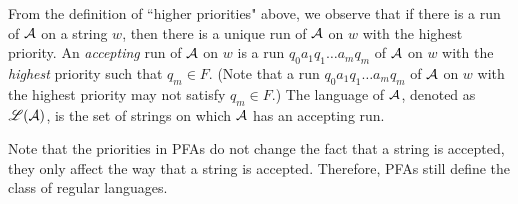 From the definition of ``higher priorities" above, we observe that if there is a  run of $\mathcal{A}$ on a string $w$, then there is a unique run of $\mathcal{A}$ on $w$ with the highest priority. 
An \emph{accepting} run of $\mathcal{A}$ on $w$ is a run $q_0 a_1 q_1 \ldots a_m q_m$ of $\mathcal{A}$ on $w$ with the \emph{highest} priority such that $q_m \in F$. (Note that a run $q_0 a_1 q_1 \ldots a_m q_m$ of $\mathcal{A}$ on $w$ with the highest priority may not satisfy $q_m \in F$.) The language of $\mathcal{A}$, denoted as $\mathscr{L}(\mathcal{A})$, is the set of strings on which $\mathcal{A}$ has an accepting run.


Note that the priorities in PFAs do not change the fact that a string is accepted, they only affect the way that a string is accepted. Therefore, PFAs still define the class of regular languages. 




